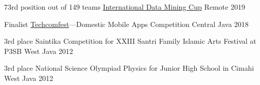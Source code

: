 




\begin{cvhonors}


\cvhonor
{73rd position out of 149 teams} %
{\href{https://www.data-mining-cup.com/}{International Data Mining Cup}} %
{Remote} %
{2019} %








\cvhonor
{Finalist} %
{\href{https://www.techcomfest.ukmpcc.org/}{Techcomfest}---Domestic Mobile Apps Competition} %
{Central Java} %
{2018} %


\cvhonor
{3rd place} %
{Saintika Competition for XXIII Santri Family Islamic Arts Festival at P3SB} %
{West Java} %
{2012} %


\cvhonor
{3rd place} %
{National Science Olympiad Physics for Junior High School in Cimahi} %
{West Java} %
{2012} %


\end{cvhonors}
